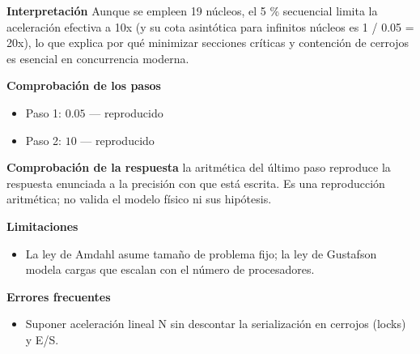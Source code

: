 \documentclass{book}
\begin{document}
\begin{tcolorbox}[title={Problema resuelto}, studiumworked, breakable]
\noindent\textbf{Interpretación}
Aunque se empleen 19 núcleos, el 5 \% secuencial limita la aceleración efectiva a 10x (y su cota asintótica para infinitos núcleos es 1 / 0.05 = 20x), lo que explica por qué minimizar secciones críticas y contención de cerrojos es esencial en concurrencia moderna.

\noindent\textbf{Comprobación de los pasos}
\begin{itemize}
\item Paso 1: $0.05$ — reproducido
\item Paso 2: $10$ — reproducido
\end{itemize}

\noindent\textbf{Comprobación de la respuesta} la aritmética del último paso reproduce la respuesta enunciada a la precisión con que está escrita. Es una reproducción aritmética; no valida el modelo físico ni sus hipótesis.

\noindent\textbf{Limitaciones}
\begin{itemize}
\item La ley de Amdahl asume tamaño de problema fijo; la ley de Gustafson modela cargas que escalan con el número de procesadores.
\end{itemize}

\noindent\textbf{Errores frecuentes}
\begin{itemize}
\item Suponer aceleración lineal N sin descontar la serialización en cerrojos (locks) y E/S.
\end{itemize}
\end{tcolorbox}
\end{document}
